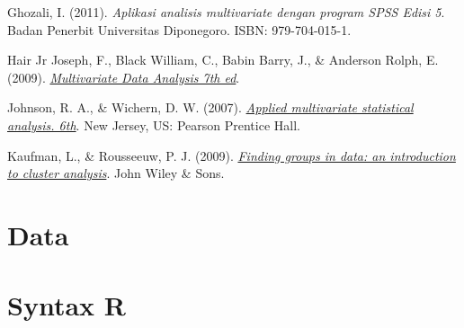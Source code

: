 \documentclass{skripsistatugm}
\begin{document}
\begin{thebibliography}{99}

Ghozali, I. (2011). \emph{Aplikasi analisis multivariate dengan program SPSS Edisi 5}. Badan Penerbit Universitas Diponegoro. ISBN: 979-704-015-1.

Hair Jr Joseph, F., Black William, C., Babin Barry, J., \& Anderson Rolph, E. (2009). \href{https://www.drnishikantjha.com/papersCollection/Multivariate%20Data%20Analysis.pdf}{\emph{Multivariate Data Analysis 7th ed}}.

Johnson, R. A., \& Wichern, D. W. (2007). \href{https://www.webpages.uidaho.edu/~stevel/519/Applied%20Multivariate%20Statistical%20Analysis%20by%20Johnson%20and%20Wichern.pdf.}{\emph{Applied multivariate statistical analysis. 6th}}. New Jersey, US: Pearson Prentice Hall. 

Kaufman, L., \& Rousseeuw, P. J. (2009). \href{https://www.researchgate.net/publication/220695963_Finding_Groups_in_Data_An_Introduction_To_Cluster_Analysis.}{\emph{Finding groups in data: an introduction to cluster analysis}}. John Wiley \& Sons.


\end{thebibliography}


\appendix
\chapter{Data}%

\chapter{Syntax R}
\lstset{language=R, frame=single}
\lstset{numbers=left, numberstyle=\tiny, stepnumber=1, numbersep=5pt, basicstyle=\footnotesize}

\end{document}
